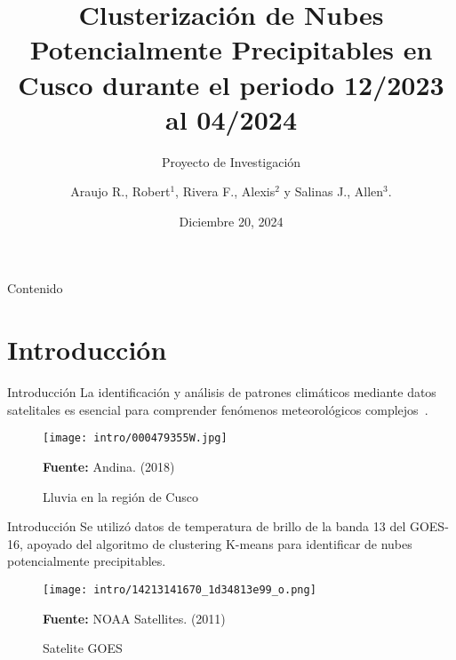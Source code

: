 \documentclass[aspectratio=169,xcolor=dvipsnames]{beamer}
\title[short title]{Clusterización de Nubes Potencialmente Precipitables en Cusco durante el periodo 12/2023 al 04/2024}
\subtitle{Proyecto de Investigación}
\author[Pin-Yen] {Araujo R., Robert$^{1}$, Rivera F., Alexis$^{2}$ y Salinas J., Allen$^{3}$.}
\institute[Universidad Nacional Agraria La Molina] %
{
    Departamento de Física y Meteorología\\
    Universidad Nacional Agraria La Molina\\
    Curso: Técnicas de Programación II\\
    Docente: MSc. Príncipe A, Erick. romelprincipea@gmail.com
    \vskip 3pt
}
\date{Diciembre 20, 2024} %
\begin{document}
\begin{frame}
    \titlepage
\end{frame}

\begin{frame}{Contenido}
    \tableofcontents
\end{frame}
\section{Introducción}
\begin{frame}{Introducción} 
    La identificación y análisis de patrones climáticos mediante datos satelitales es esencial para comprender fenómenos meteorológicos complejos~\cite{b1}.
    \begin{figure}
    \centering
    \texttt{[image: intro/000479355W.jpg]} %
    \caption{Lluvia en la región de Cusco}
    \vspace{-7pt}
    {\tiny
        \setlength{\baselineskip}{-1pt}
        \textbf{Fuente:} Andina. (2018)
    }
    \end{figure}
\end{frame}
\begin{frame}{Introducción}
        Se utilizó datos de temperatura de brillo de la banda 13 del GOES-16, apoyado del algoritmo de clustering K-means para identificar de nubes potencialmente precipitables. 

    \begin{figure}
    \centering
    \texttt{[image: intro/14213141670\_1d34813e99\_o.png]} %
    \caption{Satelite GOES}
    \vspace{-7pt}
    {\tiny
        \setlength{\baselineskip}{1pt}
        \textbf{Fuente:} NOAA Satellites. (2011)
    }
    \end{figure}
\end{frame}
\end{document}
